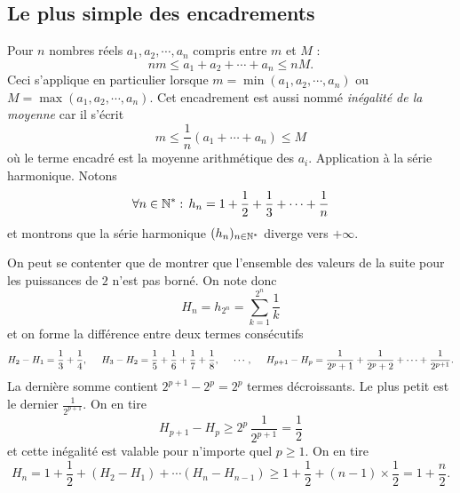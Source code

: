 \subsection{Le plus simple des encadrements}
Pour $n$ nombres réels $a_1,a_2,\cdots,a_n$ compris entre $m$ et $M$ :
\begin{displaymath}
 nm\leq a_1+a_2+\cdots +a_n \leq nM .
\end{displaymath}
Ceci s'applique en particulier lorsque $m= \min(a_1,a_2,\cdots,a_n)$ ou $M= \max(a_1,a_2,\cdots,a_n)$.
Cet  encadrement est aussi nommé \emph{inégalité de la moyenne} car il s'écrit
\begin{displaymath}
 m\leq \frac{1}{n}(a_1+\cdots+a_n)\leq M
\end{displaymath}
où le terme encadré est la  moyenne arithmétique des $a_i$.\newline
Application à la série harmonique. Notons
\begin{displaymath}
\forall n\in \mathbb{N}^*:\, h_n=1+\frac{1}{2}+\frac{1}{3}+\cdots+\frac{1}{n} 
\end{displaymath}
et montrons que la série harmonique $(h_n)_{n\in \mathbb{N}^*}$ diverge vers $+\infty$. 
\begin{demo}
On peut se contenter que de montrer que l'ensemble des valeurs de la suite pour les puissances de $2$ n'est pas borné. On note donc 
\begin{displaymath}
  H_n = h_{2^n} = \sum_{k=1}^{2^n}\frac{1}{k}
\end{displaymath}
et on forme la différence entre deux termes consécutifs
\begin{displaymath}
  H_2 - H_1 = \frac{1}{3} + \frac{1}{4},\hspace{0.5cm}
  H_3 - H_2 = \frac{1}{5} + \frac{1}{6} +\frac{1}{7} +\frac{1}{8} ,\hspace{0.5cm}
  \cdots ,\hspace{0.5cm}
  H_{p+1} - H_p = \frac{1}{2^p+1} + \frac{1}{2^p+2} + \cdots + \frac{1}{2^{p+1}}.
\end{displaymath}
La dernière somme contient $2^{p+1}-2^{p} = 2^{p}$ termes décroissants. Le plus petit est le dernier $\frac{1}{2^{p + 1}}$. On en tire
\begin{displaymath}
  H_{p+1} - H_p \geq 2^{p}\,\frac{1}{2^{p + 1}} = \frac{1}{2} 
\end{displaymath}
et cette inégalité est valable pour n'importe quel $p\geq 1$. On en tire
\begin{displaymath}
H_n = 1 + \frac{1}{2} + (H_2 - H_1) + \cdots (H_{n} - H_{n-1}) \geq 1 + \frac{1}{2} + (n-1)\times\frac{1}{2} = 1+\frac{n}{2} . 
\end{displaymath}

\end{demo}

